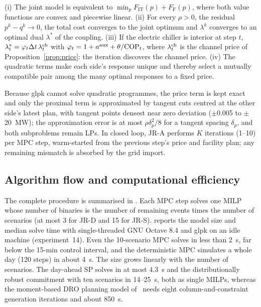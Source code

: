 \begin{proposition}\label{prop:admm}
(i) The joint model is equivalent to $\min_pF_{\mathrm{IT}}(p)+F_{\mathrm F}(p)$, where both value functions are convex
and piecewise linear. (ii) For every $\rho>0$, the residual $p^k-q^k\to0$, the total cost converges to the joint
optimum and $\lambda^k$ converges to an optimal dual $\lambda^*$ of the coupling. (iii) If the electric chiller is
interior at step $t$, $\lambda^*_t=\varphi_t\Delta t\,\lambda^{\mathrm{ch}}_t$ with $\varphi_t=1+a^{\mathrm{aux}}+\theta/\mathrm{COP}_t$, where
$\lambda^{\mathrm{ch}}_t$ is the channel price of Proposition~\ref{prop:price}: the iteration discovers the channel price. (iv) The
quadratic terms make each side's response unique and thereby select a mutually compatible pair among the many optimal
responses to a fixed price.
\end{proposition}

Because glpk cannot solve quadratic programmes, the price term is kept exact and only the proximal term is
approximated by tangent cuts centred at the other side's latest plan, with tangent points densest near zero deviation
($\pm$0.005 to $\pm$20~MW); the approximation error is at most $\rho\delta_p^2/8$ for a tangent spacing $\delta_p$,
and both subproblems remain LPs. In closed loop, JR-A performs $K$ iterations (1--10) per MPC step, warm-started from
the previous step's price and facility plan; any remaining mismatch is absorbed by the grid import.

\subsection{Algorithm flow and computational efficiency}
\label{sec:algorithm}

The complete procedure is summarised in . Each MPC step solves one MILP whose number of binaries
is the number of remaining events times the number of scenarios (at most 3 for JR-D and 15 for JR-S).
 reports the model size and median solve time with single-threaded GNU Octave 8.4 and glpk on an
idle machine (experiment~14). Even the 10-scenario MPC solves in less than 2~s, far below the 15-min control interval,
and the deterministic MPC simulates a whole day (120 steps) in about 4~s. The size grows linearly with the number of
scenarios. The day-ahead SP solves in at most 4.3~s and the distributionally robust commitment with ten scenarios in
14--25~s, both as single MILPs, whereas the moment-based DRO planning model of~\cite{zhang2026bilevel} needs eight
column-and-constraint generation iterations and about 850~s.

